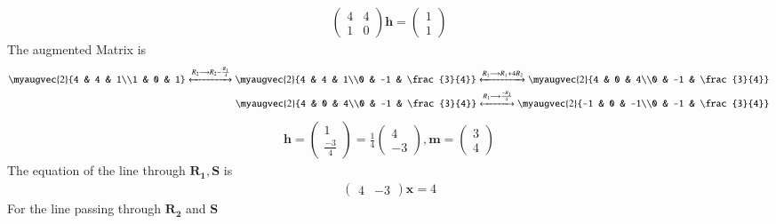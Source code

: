 \documentclass{beamer}
\theoremstyle{remark}
\newcommand{\myvec}[1]{\ensuremath{\begin{pmatrix}#1\end{pmatrix}}}
\let\vec\mathbf
\numberwithin{equation}{section}
\numberwithin{equation}{section}
\begin{document}
\begin{frame}
\begin{align}
\myvec{4&4\\1&0}\vec{h} = \myvec{1\\1}
\end{align}
The augmented Matrix is
\begin{align}
  \myaugvec{2}{4 & 4 & 1\\1 & 0 & 1} \xleftrightarrow{R_2 \longrightarrow R_2-\frac{R_1}{4}} 
  \myaugvec{2}{4 & 4 & 1\\0 & -1 & \frac{3}{4}} \xleftrightarrow{R_1 \longrightarrow R_1+4R_2}
\myaugvec{2}{4 & 0 & 4\\0 & -1 & \frac{3}{4}} \\
\myaugvec{2}{4 & 0 & 4\\0 & -1 & \frac{3}{4}} \xleftrightarrow{R_1 \longrightarrow \frac{-R_1}{4}} \myaugvec{2}{-1 & 0 & -1\\0 & -1 & \frac{3}{4}}
\end{align}
\begin{align}
\vec{h} = \myvec{1\\ \frac{-3}{4}} = \frac{1}{4}\myvec{4\\-3} , \vec{m} = \myvec{3\\4}
\end{align}
The equation of the line through $\vec{R_1},\vec{S}$ is
\begin{align}
\myvec{4&-3}\vec{x} = 4  \label{eq: line1}
\end{align}
For the line passing through $\vec{R_2}$ and $\vec{S}$
\end{frame}
\end{document}
